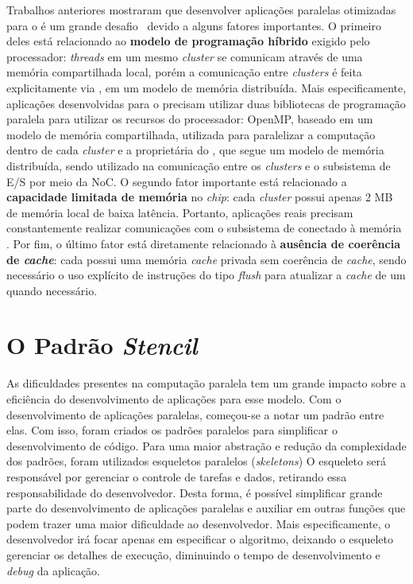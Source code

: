Trabalhos anteriores mostraram que desenvolver aplicações paralelas otimizadas
para o \mppa é um grande desafio~\cite{Castro-IA3-JPDC:2014} devido a alguns
fatores importantes. O primeiro deles está relacionado ao \textbf{modelo de
    programação híbrido} exigido pelo processador: \textit{threads} em um mesmo
\textit{cluster} se comunicam através de uma memória compartilhada local, porém
a comunicação entre \textit{clusters} é feita explicitamente via \noc, em um
modelo de memória distribuída. Mais especificamente, aplicações desenvolvidas
para o \mppa precisam utilizar duas bibliotecas de programação paralela para
utilizar os recursos do processador: OpenMP, baseado em um modelo de memória
compartilhada, utilizada para paralelizar a computação dentro de cada
\textit{cluster} e a \api proprietária do \mppa, que segue um modelo de memória
distribuída, sendo utilizado na comunicação entre os \textit{clusters} e o
subsistema de E/S por meio da NoC. O segundo fator importante está relacionado a
\textbf{capacidade limitada de memória} no \textit{chip}: cada \textit{cluster}
possui apenas 2 MB de memória local de baixa latência. Portanto, aplicações
reais precisam constantemente realizar comunicações com o subsistema de \io
conectado à memória \lpddr. Por fim, o último fator está diretamente relacionado
à \textbf{ausência de coerência de \textit{cache}}: cada \pe possui uma memória
\textit{cache} privada sem coerência de \textit{cache}, sendo necessário o uso
explícito de instruções do tipo \textit{flush} para atualizar a \textit{cache}
de um \pe quando necessário.


\section{O Padrão \textit{Stencil}}

As dificuldades presentes na computação paralela tem um grande impacto sobre a
eficiência do desenvolvimento de aplicações para esse modelo. Com o
desenvolvimento de aplicações paralelas, começou-se a notar um padrão entre
elas. Com isso, foram criados os padrões paralelos para simplificar o
desenvolvimento de código.
Para uma maior abstração e redução da complexidade dos padrões, foram utilizados
esqueletos paralelos (\textit{skeletons}) O esqueleto será responsável por
gerenciar o controle de tarefas e dados, retirando essa responsabilidade do
desenvolvedor. Desta forma, é possível simplificar grande parte do
desenvolvimento de aplicações paralelas e auxiliar em outras funções que podem
trazer uma maior dificuldade ao desenvolvedor. Mais especificamente, o
desenvolvedor irá focar apenas em especificar o algoritmo, deixando o esqueleto
gerenciar os detalhes de execução, diminuindo o tempo de desenvolvimento e
\textit{debug} da aplicação.

